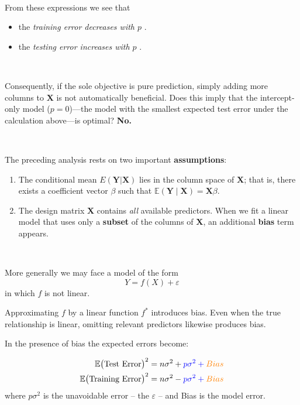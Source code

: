 \documentclass[
]{book}
\begin{document}
~

From these expressions we see that

\begin{itemize}
\item
  the \emph{training error decreases with \(p\)} .
\item
  the \emph{testing error increases with \(p\)} .
\end{itemize}

~

Consequently, if the sole objective is pure prediction, simply adding more columns to \(\mathbf{X}\) is not automatically beneficial. Does this imply that the intercept-only model (\(p=0\))---the model with the smallest expected test error under the calculation above---is optimal? \textbf{No.}

~

The preceding analysis rests on two important \textbf{assumptions}:

\begin{enumerate}
\def\labelenumi{\arabic{enumi}.}
\item
  The conditional mean \(E(\mathbf{Y}|\mathbf{X})\) lies in the column space of \(\mathbf{X}\); that is, there exists a coefficient vector \(\beta\) such that \(\mathbb{E}(\mathbf{Y}\mid\mathbf{X}) =\mathbf{X}\beta\).
\item
  The design matrix \(\mathbf{X}\) contains \emph{all} available predictors. When we fit a linear model that uses only a \textbf{subset} of the columns of \(\mathbf{X}\), an additional \textbf{bias} term appears.
\end{enumerate}

~

More generally we may face a model of the form
\[Y = f(X) + \varepsilon\]
in which \(f\) is not linear.

Approximating \(f\) by a linear function \(f^*\) introduces bias. Even when the true relationship is linear, omitting relevant predictors likewise produces bias.

In the presence of bias the expected errors become:

\begin{align*}
\mathbb{E}\bigl(\text{Test Error}\bigr)^2 &= n\sigma^2 + \color{blue}{p\sigma^2} + \color{orange}{Bias}\\
\mathbb{E}\bigl(\text{Training Error}\bigr)^2 &= n\sigma^2 - \color{blue}{p\sigma^2} + \color{orange}{Bias}
\end{align*}
where \(p\sigma^2\) is the unavoidable error -- the \(\varepsilon\) -- and Bias is the model error.
\end{document}
